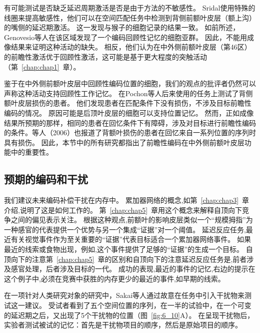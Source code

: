有可能测试是否缺乏延迟周期激活是否是由于方法的不敏感性。
Sridal\cite{srimal2008persistent}使用特殊的线圈来提高敏感性，他们可以在空间匹配任务中检测到背侧前额叶皮层（额上沟）的嘴侧的延迟期激活。
这一发现与猴子的细胞记录的结果一致。
如前所述，Genovesio等人\cite{genovesio2006representation}在该区域发现了一个编码回顾性记忆的细胞亚群。
因此，不能用成像结果来证明这种活动的缺失。
相反，他们认为在中外侧前额叶皮层（第46区）的前瞻性激活优于回顾性激活，这可能是基于更大程度的突触活动（第~\ref{chap:chap1}~章）。



鉴于在中外侧前额叶皮层中回顾性编码位置的细胞，我们的观点的批评者仍然可以声称这种活动支持回顾性工作记忆。
在Pochon等人后来使用的任务上测试了背侧额叶皮层损伤的患者。
他们发现患者在匹配条件下没有损伤，不涉及目标前瞻性编码的情况。
原因可能是后顶叶皮层的细胞可以支持位置记忆。
然而，正如成像结果所预期的那样，相同的患者在回忆条件下有障碍，涉及对目标进行前瞻性编码的条件\cite{ferreira1998spatio}。等人（2006）也报道了背额叶损伤的患者在回忆来自一系列位置的序列时具有损伤。
因此，本节中的所有研究都指出了前瞻性编码在中外侧前额叶皮层功能中的重要性。



\subsection{预期的编码和干扰}

我们建议未来编码补偿干扰在内存中。
累加器网络的概念,如第~\ref{chap:chap3}~章介绍,说明了这是如何工作的。
第~\ref{chap:chap5}~章用这个概念来解释自顶向下竞争之间的偏见表示关注。
根据这种观点,前额叶的影响皮层类似一个“规模拇指”为一种感官的代表提供一个优势与另一个集成“证据”对一个阈值。
延迟反应任务,最近有关视觉事件作为至关重要的“证据”代表目标适合一个累加器网络事件。
如果最近的线索或食物出现，例如,这个事件提供了足够的“证据”的生成一个目标。
自顶向下的注意第~\ref{chap:chap5}~章的区别和自顶向下的注意延迟反应任务是,前者涉及感官处理，后者涉及目标的一代。
成功的表现,最近的事件的记忆,右边的提示在这个例子中,必须在竞赛中获胜的内存更少的最近的事件,如早期的线索。


在一项针对人类研究对象的研究中，Sakai等人\cite{sakai2002active}通过故意在任务中引入干扰物来测试这一建议。
受试者看到了五个空间位置的序列，在一半的试验中，在一个可变的延迟期之后，又出现了5个干扰物的位置（图~\ref{fig:6_10}A）。
在呈现干扰物后，实验者测试被试的记忆：首先是干扰物项目的顺序，然后是原始项目的顺序。


